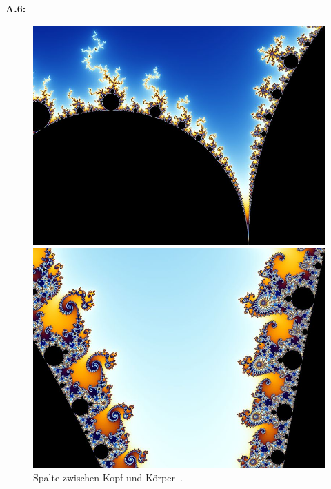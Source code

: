 \noindent\textbf{A.6:}\label{app:6}
\begin{figure}[H]\label{fig:mandelbrot-set-zoom-images}
  \centering
  \begin{minipage}[t]{0.40\textwidth}
    \centering
    \includegraphics[width=\linewidth]{images/zoom/800px-Mandel_zoom_01_head_and_shoulder}
    \vspace*{-4ex}
    \caption{Spalte zwischen Kopf und Körper~\cite{beyer_partial_2005}.}
    \label{app:6.1}
  \end{minipage}%
  \hspace{8ex}
  \begin{minipage}[t]{0.40\textwidth}
    \centering
    \includegraphics[width=\linewidth]{images/zoom/800px-Mandel_zoom_02_seehorse_valley}

\end{minipage}
\end{figure}
